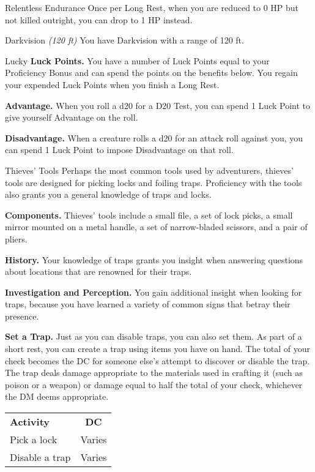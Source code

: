 \begin{Card}{Relentless Endurance}
Once per Long Rest, when you are reduced to 0 HP but not killed outright, you can drop to 1 HP instead.
\end{Card}


\begin{Card}{Darkvision \textit{(120 ft)}}
You have Darkvision with a range of 120 ft.
\end{Card}


\begin{Card}{Lucky}
\textbf{Luck Points.} You have a number of Luck Points equal to your Proficiency Bonus and can spend the points on the benefits below. You regain your expended Luck Points when you finish a Long Rest.

\textbf{Advantage.} When you roll a d20 for a D20 Test, you can spend 1 Luck Point to give yourself Advantage on the roll.

\textbf{Disadvantage.} When a creature rolls a d20 for an attack roll against you, you can spend 1 Luck Point to impose Disadvantage on that roll.
\end{Card}

\begin{Card}{Thieves' Tools}
Perhaps the most common tools used by adventurers, thieves’ tools are designed for picking locks and foiling traps. Proficiency with the tools also grants you a general knowledge of traps and locks.

\textbf{Components.} Thieves’ tools include a small file, a set of lock picks, a small mirror mounted on a metal handle, a set of narrow-bladed scissors, and a pair of pliers.

\textbf{History.} Your knowledge of traps grants you insight when answering questions about locations that are renowned for their traps.

\textbf{Investigation and Perception.} You gain additional insight when looking for traps, because you have learned a variety of common signs that betray their presence.

\textbf{Set a Trap.} Just as you can disable traps, you can also set them. As part of a short rest, you can create a trap using items you have on hand. The total of your check becomes the DC for someone else’s attempt to discover or disable the trap. The trap deals damage appropriate to the materials used in crafting it (such as poison or a weapon) or damage equal to half the total of your check, whichever the DM deems appropriate.

\begin{tabular}{lc}
\textbf{Activity} & \textbf{DC} \\
Pick a lock & Varies \\
Disable a trap & Varies \\
\end{tabular}
\end{Card}


